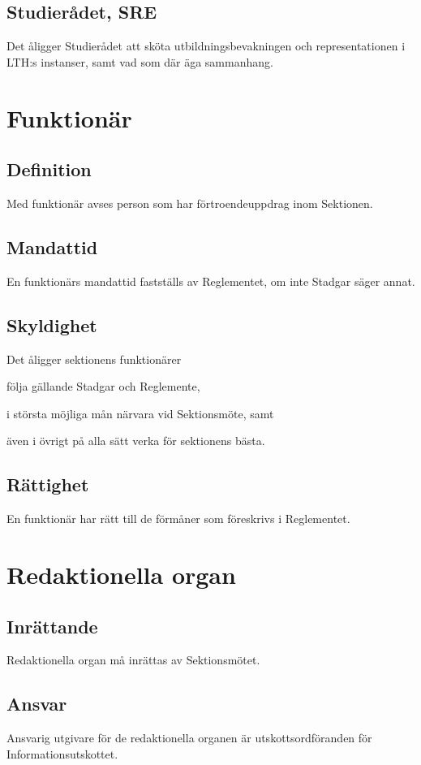 \documentclass[10pt]{article}
\begin{document}
\subsection{Studierådet, SRE}
Det åligger Studierådet att sköta utbildningsbevakningen och representationen i LTH:s instanser, samt vad som där äga sammanhang.

\section{Funktionär}
\subsection{Definition}
Med funktionär avses person som har förtroendeuppdrag inom Sektionen.

\subsection{Mandattid}
En funktionärs mandattid fastställs av Reglementet, om inte Stadgar säger
annat.

\subsection{Skyldighet}
Det åligger sektionens funktionärer
\begin{attlist}
\item följa gällande Stadgar och Reglemente,
\item i största möjliga mån närvara vid Sektionsmöte, samt
\item även i övrigt på alla sätt verka för sektionens bästa.
\end{attlist}

\subsection{Rättighet}
En funktionär har rätt till de förmåner som föreskrivs i Reglementet.
\newpage

\section{Redaktionella organ}
\subsection{Inrättande}
Redaktionella organ må inrättas av Sektionsmötet.

\subsection{Ansvar}
Ansvarig utgivare för de redaktionella organen är utskottsordföranden för Informationsutskottet.
\end{document}
